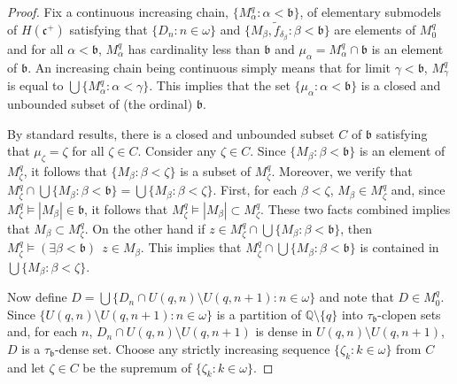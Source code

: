 \documentclass{amsart}
\theoremstyle{definition}
\theoremstyle{remark}
\begin{document}
\begin{proof}
  Fix a continuous increasing chain, $\{ M^q_\alpha : \alpha < \mathfrak b\}$,
   of elementary submodels of $H(\mathfrak c^+)$ satisfying that
   $\{D_n :n\in\omega\}$ and 
     $\{ M_\beta, \tilde f_{\delta_\beta}
     : \beta < \mathfrak b\}$ are elements of $ M^q_0$ and for all
      $\alpha<\mathfrak b$, $M^q_\alpha$ has cardinality less
      than $\mathfrak b$ and $\mu_\alpha = M^q_\alpha\cap \mathfrak b$
      is an element of $\mathfrak b$. 
 An increasing chain being continuous simply means that for
limit $\gamma<\mathfrak b$,  
$M^q_\gamma$ is equal to $\bigcup\{ M^q_\alpha :\alpha < \gamma\}$.
This implies that the set $\{ \mu_\alpha : \alpha <\mathfrak b\}$
is a closed and unbounded subset of (the ordinal) $\mathfrak b$. 



By standard results, there is a closed and unbounded
subset $C$ of $\mathfrak b$ satisfying that
 $\mu_\zeta  = \zeta$ for all $\zeta\in C$.
Consider any $\zeta\in C$.
    Since $\{M_\beta : \beta < \mathfrak b\}$
is an element of $M^q_\zeta$, it follows that $\{M_\beta : \beta < \zeta\}$
is a subset of $M^q_\zeta$. Moreover, we verify that $M^q_\zeta\cap
 \bigcup \{ M_\beta : \beta < \mathfrak b\} = 
 \bigcup \{ M_\beta : \beta < \zeta\}$.  First, for each 
  $\beta < \zeta$, $M_\beta\in M^q_\zeta$ and, since 
  $M^q_\zeta \models |M_\beta| \in \mathfrak b$, 
  it follows that $M^q_\zeta\models |M_\beta|\subset M^q_\zeta$.
  These two facts combined implies that $M_\beta\subset M^q_\zeta$. 
  On the other hand if $z\in M^q_\zeta\cap \bigcup\{ M_\beta : \beta < 
  \mathfrak b\}$, then $M^q_\zeta \models (\exists \beta <\mathfrak b)~~
  z\in M_\beta$. This implies that $M^q_\zeta\cap 
  \bigcup\{ M_\beta : \beta < \mathfrak b\}
$ is contained in $\bigcup\{ M_\beta : \beta < \zeta\}$. 


 
Now define $D = \bigcup \{ D_n\cap U(q,n)\setminus U(q,n+1) : n\in\omega\}$
and note that $D\in M^q_0$. Since $\{ U(q,n)\setminus U(q,n+1) : n\in \omega\}$
is a partition of $\mathbb Q\setminus \{q\}$ into $\tau_{\mathfrak b}$-clopen
sets and, for each $n$,  $D_n\cap U(q,n)\setminus U(q,n+1)$ is dense
in $U(q,n)\setminus U(q,n+1)$, 
  $D$ is a $\tau_{\mathfrak b}$-dense set.  
 Choose any strictly increasing sequence $\{ \zeta_k :
 k\in \omega\}$ from $C$ and let  $\zeta\in C$ be the supremum
  of $\{\zeta_k : k\in\omega\}$.




\end{proof}
\end{document}
